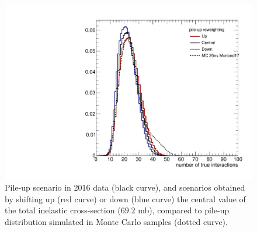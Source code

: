 \begin{figure}[!htb]
  \begin{center}
    \includegraphics[width=.495\textwidth]{figures/PU_Moriond17.pdf}
  \end{center}
  \caption{Pile-up scenario in 2016 data (black curve), and scenarios obtained by shifting up (red curve) or down (blue curve) the central value of the total inelastic cross-section ($69.2$ mb), compared to pile-up distribution simulated in Monte Carlo samples (dotted curve).}
  \label{fig:PU_updown}
\end{figure}

